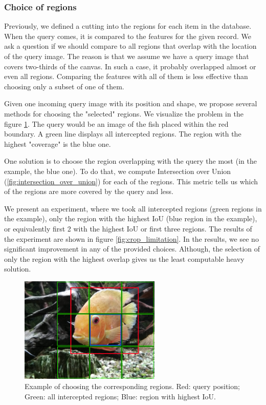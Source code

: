\subsubsection{Choice of regions}

Previously, we defined a cutting into the regions for each item in the database. When the query comes, it is compared to the features for the given record. We ask a question if we should compare to all regions that overlap with the location of the query image. The reason is that we assume we have a query image that covers two-thirds of the canvas. In such a case, it probably overlapped almost or even all regions. Comparing the features with all of them is less effective than choosing only a subset of one of them.

Given one incoming query image with its position and shape, we propose several methods for choosing the "selected" regions. We visualize the problem in the figure \ref{fig:fish_with_grid}. The query would be an image of the fish placed within the red boundary. A green line displays all intercepted regions. The region with the highest "coverage" is the blue one.

One solution is to choose the region overlapping with the query the most (in the example, the blue one). To do that, we compute Intersection over Union (\ref{fig:intersection_over_union}) for each of the regions. This metric tells us which of the regions are more covered by the query and less.


We present an experiment, where we took all intercepted regions (green regions in the example), only the region with the highest IoU (blue region in the example), or equivalently first 2 with the highest IoU or first three regions. The results of the experiment are shown in figure \ref{fig:crop_limitation}. In the results, we see no significant improvement in any of the provided choices. Although, the selection of only the region with the highest overlap gives us the least computable heavy solution.

\begin{figure}
\centering
\includegraphics[width=0.6\textwidth]{img/fish_grid_regions}
\caption{Example of choosing the corresponding regions. Red: query position; Green: all intercepted regions; Blue: region with highest IoU.}
\label{fig:fish_with_grid}
\end{figure}


